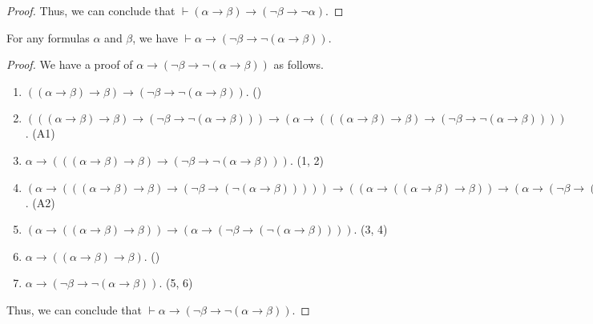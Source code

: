 \begin{proof}
  Thus, we can conclude that
  $\vdash (\alpha \to \beta) \to (\neg\beta \to \neg\alpha)$.
\end{proof}

\begin{theorem}
  For any formulas $\alpha$ and $\beta$, we have $\vdash \alpha \to (\neg\beta
  \to \neg(\alpha \to \beta))$.
\end{theorem}
\begin{proof}
  We have a proof of $\alpha \to (\neg\beta \to \neg(\alpha \to \beta))$
  as follows.
  \begin{enumerate}[(1)]
    \item $((\alpha \to \beta) \to \beta) \to (\neg\beta \to \neg(\alpha \to
    \beta))$. \hfill ()
    \item $(((\alpha \to \beta) \to \beta) \to (\neg\beta \to \neg(\alpha \to
    \beta))) \to (\alpha \to (((\alpha \to \beta) \to \beta) \to (\neg\beta \to
    \neg(\alpha \to \beta))))$. \hfill (A1)
    \item $\alpha \to (((\alpha \to \beta) \to \beta) \to (\neg\beta \to
    \neg(\alpha \to \beta)))$. \hfill (1, 2)
    \item $(\alpha \to (((\alpha \to \beta) \to \beta) \to (\neg\beta \to
    (\neg(\alpha \to \beta))))) \to ((\alpha \to ((\alpha \to \beta) \to
    \beta)) \to (\alpha \to (\neg\beta \to (\neg(\alpha \to \beta)))))$.
    \hfill (A2)
    \item $(\alpha \to ((\alpha \to \beta) \to \beta)) \to (\alpha \to
    (\neg\beta \to (\neg(\alpha \to \beta))))$. \hfill (3, 4)
    \item $\alpha \to ((\alpha \to \beta) \to \beta)$. \hfill
    ()
    \item $\alpha \to (\neg\beta \to \neg(\alpha \to \beta))$. \hfill (5, 6)
  \end{enumerate}
  Thus, we can conclude that $\vdash \alpha \to (\neg\beta \to \neg(\alpha \to
  \beta))$.
\end{proof}

